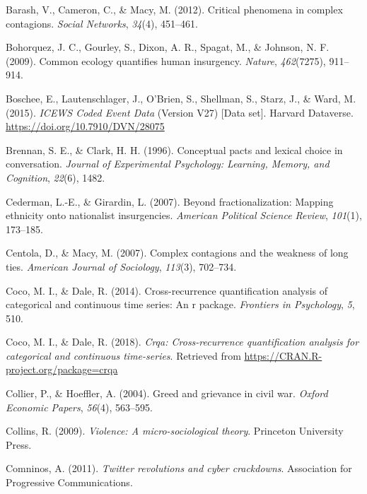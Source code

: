 \documentclass[english,man]{apa6}
\begin{document}
\leavevmode\hypertarget{ref-barash2012critical}{}%
Barash, V., Cameron, C., \& Macy, M. (2012). Critical phenomena in complex contagions. \emph{Social Networks}, \emph{34}(4), 451--461.

\leavevmode\hypertarget{ref-bohorquez2009common}{}%
Bohorquez, J. C., Gourley, S., Dixon, A. R., Spagat, M., \& Johnson, N. F. (2009). Common ecology quantifies human insurgency. \emph{Nature}, \emph{462}(7275), 911--914.

\leavevmode\hypertarget{ref-DVNux2f28075_2015}{}%
Boschee, E., Lautenschlager, J., O'Brien, S., Shellman, S., Starz, J., \& Ward, M. (2015). \emph{ICEWS Coded Event Data} (Version V27) {[}Data set{]}. Harvard Dataverse. \url{https://doi.org/10.7910/DVN/28075}

\leavevmode\hypertarget{ref-brennan1996conceptual}{}%
Brennan, S. E., \& Clark, H. H. (1996). Conceptual pacts and lexical choice in conversation. \emph{Journal of Experimental Psychology: Learning, Memory, and Cognition}, \emph{22}(6), 1482.

\leavevmode\hypertarget{ref-cederman2007beyond}{}%
Cederman, L.-E., \& Girardin, L. (2007). Beyond fractionalization: Mapping ethnicity onto nationalist insurgencies. \emph{American Political Science Review}, \emph{101}(1), 173--185.

\leavevmode\hypertarget{ref-centola2007complex}{}%
Centola, D., \& Macy, M. (2007). Complex contagions and the weakness of long ties. \emph{American Journal of Sociology}, \emph{113}(3), 702--734.

\leavevmode\hypertarget{ref-coco2014cross}{}%
Coco, M. I., \& Dale, R. (2014). Cross-recurrence quantification analysis of categorical and continuous time series: An r package. \emph{Frontiers in Psychology}, \emph{5}, 510.

\leavevmode\hypertarget{ref-R-crqa}{}%
Coco, M. I., \& Dale, R. (2018). \emph{Crqa: Cross-recurrence quantification analysis for categorical and continuous time-series}. Retrieved from \url{https://CRAN.R-project.org/package=crqa}

\leavevmode\hypertarget{ref-collier2004greed}{}%
Collier, P., \& Hoeffler, A. (2004). Greed and grievance in civil war. \emph{Oxford Economic Papers}, \emph{56}(4), 563--595.

\leavevmode\hypertarget{ref-collins2009violence}{}%
Collins, R. (2009). \emph{Violence: A micro-sociological theory}. Princeton University Press.

\leavevmode\hypertarget{ref-comninos2011twitter}{}%
Comninos, A. (2011). \emph{Twitter revolutions and cyber crackdowns}. Association for Progressive Communications.
\end{document}

